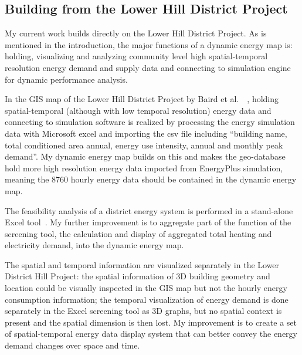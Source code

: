 \subsection{Building from the Lower Hill District Project}
My current work builds directly on the Lower Hill District Project. As
is mentioned in the introduction, the major functions of a dynamic
energy map is: holding, visualizing and analyzing community level high
spatial-temporal resolution energy demand and supply data and
connecting to simulation engine for dynamic performance analysis.

In the GIS map of the Lower Hill District Project by Baird et al.\
~\cite{baird2014}, holding spatial-temporal (although with low
temporal resolution) energy data and connecting to simulation software
is realized by processing the energy simulation data with Microsoft
excel and importing the csv file including ``building name, total
conditioned area annual, energy use intensity, annual and monthly peak
demand''. My dynamic energy map builds on this and makes the
geo-database hold more high resolution energy data imported from
EnergyPlus simulation, meaning the 8760 hourly energy data should be
contained in the dynamic energy map.

The feasibility analysis of a district energy system is performed in a
stand-alone Excel tool~\cite{baird2014}. My further improvement is to
aggregate part of the function of the screening tool, the calculation
and display of aggregated total heating and electricity demand, into
the dynamic energy map.

The spatial and temporal information are visualized separately in the
Lower District Hill Project: the spatial information of 3D building
geometry and location could be visually inspected in the GIS map but
not the hourly energy consumption information; the temporal
visualization of energy demand is done separately in the Excel
screening tool as 3D graphs, but no spatial context is present and the
spatial dimension is then lost. My improvement is to create a set of
spatial-temporal energy data display system that can better convey the
energy demand changes over space and time.